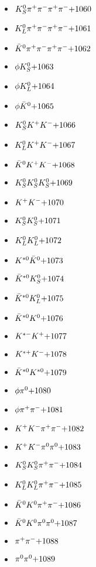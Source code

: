 \begin{multicols}{3}
\begin{itemize}
 \item $ K_{S}^{0} \pi^{+} \pi^{-} \pi^{+} \pi^{-} \hfill{+1060}$
 \item $ K_{L}^{0} \pi^{+} \pi^{-} \pi^{+} \pi^{-} \hfill{+1061}$
 \item $ \bar{K}^{0} \pi^{+} \pi^{-} \pi^{+} \pi^{-} \hfill{+1062}$
 \item $ \phi K_{S}^{0} \hfill{+1063}$
 \item $ \phi K_{L}^{0} \hfill{+1064}$
 \item $ \phi \bar{K}^{0} \hfill{+1065}$
 \item $ K_{S}^{0} K^{+} K^{-} \hfill{+1066}$
 \item $ K_{L}^{0} K^{+} K^{-} \hfill{+1067}$
 \item $ \bar{K}^{0} K^{+} K^{-} \hfill{+1068}$
 \item $ K_{S}^{0} K_{S}^{0} K_{S}^{0} \hfill{+1069}$
 \item $ K^{+} K^{-} \hfill{+1070}$
 \item $ K_{S}^{0} K_{S}^{0} \hfill{+1071}$
 \item $ K_{L}^{0} K_{L}^{0} \hfill{+1072}$
 \item $ K^{*0} \bar{K}^{0} \hfill{+1073}$
 \item $ \bar{K}^{*0} K_{S}^{0} \hfill{+1074}$
 \item $ \bar{K}^{*0} K_{L}^{0} \hfill{+1075}$
 \item $ \bar{K}^{*0} K^{0} \hfill{+1076}$
 \item $ K^{*-} K^{+} \hfill{+1077}$
 \item $ K^{*+} K^{-} \hfill{+1078}$
 \item $ \bar{K}^{*0} K^{*0} \hfill{+1079}$
 \item $ \phi \pi^{0} \hfill{+1080}$
 \item $ \phi \pi^{+} \pi^{-} \hfill{+1081}$
 \item $ K^{+} K^{-} \pi^{+} \pi^{-} \hfill{+1082}$
 \item $ K^{+} K^{-} \pi^{0} \pi^{0} \hfill{+1083}$
 \item $ K_{S}^{0} K_{S}^{0} \pi^{+} \pi^{-} \hfill{+1084}$
 \item $ K_{L}^{0} K_{L}^{0} \pi^{+} \pi^{-} \hfill{+1085}$
 \item $ \bar{K}^{0} K^{0} \pi^{+} \pi^{-} \hfill{+1086}$
 \item $ \bar{K}^{0} K^{0} \pi^{0} \pi^{0} \hfill{+1087}$
 \item $ \pi^{+} \pi^{-} \hfill{+1088}$
 \item $ \pi^{0} \pi^{0} \hfill{+1089}$

\end{itemize}
\end{multicols}
